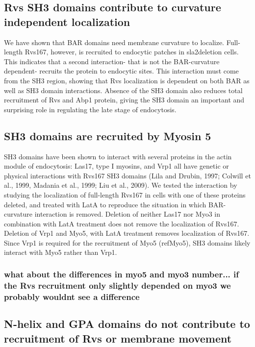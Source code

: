 \documentclass[9pt,lineno]{elife}
\begin{document}
\subsection{Rvs SH3 domains contribute to curvature independent localization}
We have shown that BAR domains need membrane curvature to localize. Full-length Rvs167, however, is recruited to endocytic patches in sla2deletion cells. This indicates that a second interaction- that is not the BAR-curvature dependent- recruits the protein to endocytic sites. This interaction must come from the SH3 region, showing that Rvs localization is dependent on both BAR as well as SH3 domain interactions. Absence of the SH3 domain also reduces total recruitment of Rvs and Abp1 protein, giving the SH3 domain an important and surprising role in regulating the late stage of endocytosis. 

\subsection{SH3 domains are recruited by Myosin 5}
SH3 domains have been shown to interact with several proteins in the actin module of endocytosis: Las17, type I myosins, and Vrp1 all have genetic or physical interactions with Rvs167 SH3 domains (Lila and Drubin, 1997; Colwill et al., 1999, Madania et al., 1999; Liu et al., 2009). 
We tested the interaction by studying the localization of full-length Rvs167 in cells with one of these proteins deleted, and treated with LatA to reproduce the situation in which BAR-curvature interaction is removed. 
Deletion of neither Las17 nor Myo3 in combination with LatA treatment does not remove the localization of Rvs167. Deletion of Vrp1 and Myo5, with LatA treatment removes localization of Rvs167. Since Vrp1 is required for the recruitment of Myo5 (refMyo5), SH3 domains likely interact with Myo5 rather than Vrp1. 
\subsubsection{\color{red} 
	what about the differences in myo5 and myo3 number... if the Rvs recruitment only slightly depended on myo3 we probably wouldnt see a difference
}

\subsection{N-helix and GPA domains do not contribute to recruitment of Rvs or membrane movement}
\lipsum[12]
	
\end{document}

